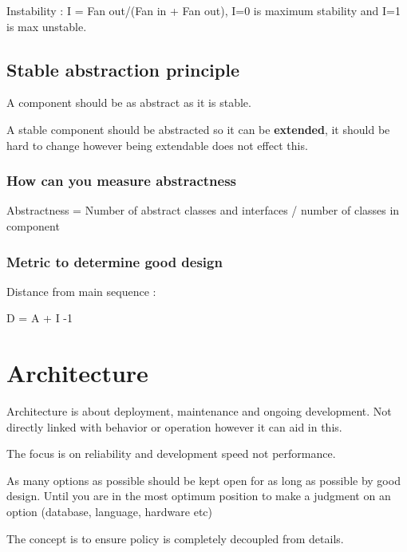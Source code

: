 \documentclass[11pt]{scrartcl} %
\begin{document}
Instability : I = Fan out/(Fan in + Fan out), I=0 is maximum stability
and I=1 is max unstable.

\subsection{Stable abstraction principle}

A component should be as abstract as it is stable.

A stable component should be abstracted so it can be \textbf{extended},
it should be hard to change however being extendable does not effect
this.

\subsubsection{How can you measure abstractness}

Abstractness = Number of abstract classes and interfaces / number of
classes in component


\subsubsection{Metric to determine good design}

Distance from main sequence :

D = \textbar{} A + I -1 \textbar{}

\section{Architecture}

Architecture is about deployment, maintenance and ongoing development.
Not directly linked with behavior or operation however it can aid in
this.

The focus is on reliability and development speed not performance.

As many options as possible should be kept open for as long as possible
by good design. Until you are in the most optimum position to make a
judgment on an option (database, language, hardware etc)

The concept is to ensure policy is completely decoupled from details.

\end{document}

